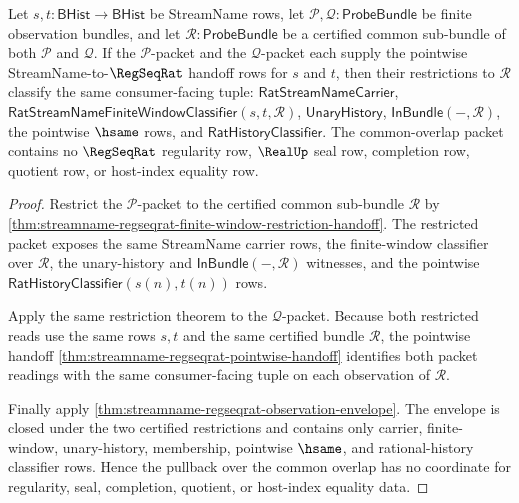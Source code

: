 \begin{theorem}
\label{thm:streamname-regseqrat-overlap-pullback-handoff}
Let $s,t:\mathsf{BHist}\to\mathsf{BHist}$ be StreamName rows, let
$\mathcal P,\mathcal Q:\mathsf{ProbeBundle}$ be finite observation bundles,
and let $\mathcal R:\mathsf{ProbeBundle}$ be a certified common sub-bundle
of both $\mathcal P$ and $\mathcal Q$. If the $\mathcal P$-packet and the
$\mathcal Q$-packet each supply the pointwise StreamName-to-$\RegSeqRat$
handoff rows for $s$ and $t$, then their restrictions to $\mathcal R$
classify the same consumer-facing tuple:
$\mathsf{RatStreamNameCarrier}$,
$\mathsf{RatStreamNameFiniteWindowClassifier}(s,t,\mathcal R)$,
$\mathsf{UnaryHistory}$, $\mathsf{InBundle}(-,\mathcal R)$, the pointwise
$\hsame$ rows, and $\mathsf{RatHistoryClassifier}$. The common-overlap
packet contains no $\RegSeqRat$ regularity row, $\RealUp$ seal row,
completion row, quotient row, or host-index equality row.
\end{theorem}
\begin{proof}
Restrict the $\mathcal P$-packet to the certified common sub-bundle
$\mathcal R$ by
\autoref{thm:streamname-regseqrat-finite-window-restriction-handoff}. The
restricted packet exposes the same StreamName carrier rows, the finite-window
classifier over $\mathcal R$, the unary-history and
$\mathsf{InBundle}(-,\mathcal R)$ witnesses, and the pointwise
$\mathsf{RatHistoryClassifier}(s(n),t(n))$ rows.

Apply the same restriction theorem to the $\mathcal Q$-packet. Because both
restricted reads use the same rows $s,t$ and the same certified bundle
$\mathcal R$, the pointwise handoff
\autoref{thm:streamname-regseqrat-pointwise-handoff} identifies both packet
readings with the same consumer-facing tuple on each observation of
$\mathcal R$.

Finally apply
\autoref{thm:streamname-regseqrat-observation-envelope}. The envelope is
closed under the two certified restrictions and contains only carrier,
finite-window, unary-history, membership, pointwise $\hsame$, and
rational-history classifier rows. Hence the pullback over the common overlap
has no coordinate for regularity, seal, completion, quotient, or host-index
equality data.
\end{proof}


